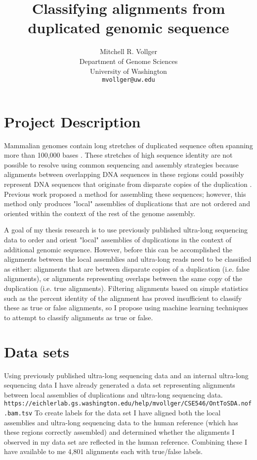 \documentclass{article}
\title{Classifying alignments from duplicated genomic sequence}
\author{
  Mitchell R. Vollger
    \\
  Department of Genome Sciences\\
  University of Washington\\
  \texttt{mvollger@uw.edu} \\
}
\begin{document}

\maketitle

\section*{Project Description}

Mammalian genomes contain long stretches of duplicated sequence often spanning more than 100,000 bases \parencite{Lander2001, Waterston2002}. These stretches of high sequence identity are not possible to resolve using common sequencing and assembly strategies because alignments between overlapping DNA sequences in these regions could possibly represent DNA sequences that originate from disparate copies of the duplication \parencite{Pop2004, Chin2016, Gordon2016, Koren2017}. Previous work \parencite{Chaisson2017, Vollger2018} proposed a method for assembling these sequences; however, this method only produces "local" assemblies of duplications that are not ordered and oriented within the context of the rest of the genome assembly. 

A goal of my thesis research is to use previously published ultra-long sequencing data \parencite{Jain2018} to order and orient "local" assemblies of duplications in the context of additional genomic sequence. However, before this can be accomplished the alignments between the local assemblies and ultra-long reads need to be classified as either: alignments that are between disparate copies of a duplication (i.e. false alignments), or alignments representing overlaps between the same copy of the duplication (i.e. true alignments). Filtering alignments based on simple statistics such as the percent identity of the alignment has proved insufficient to classify these as true or false alignments, so I propose using machine learning techniques to attempt to classify alignments as true or false. 

\section*{Data sets}
Using previously published ultra-long sequencing data \parencite{Jain2018} and an internal ultra-long sequencing data I have already generated a data set representing alignments between local assemblies of duplications and ultra-long sequencing data.
\texttt{https://eichlerlab.gs.washington.edu/help/mvollger/CSE546/OntToSDA.nof.bam.tsv} 
To create labels for the data set I have aligned both the local assemblies and ultra-long sequencing data to the human reference (which has these regions correctly assembled) and determined whether the alignments I observed in my data set are reflected in the human reference. Combining these I have available to me 4,801 alignments each with true/false labels.  
\end{document}
